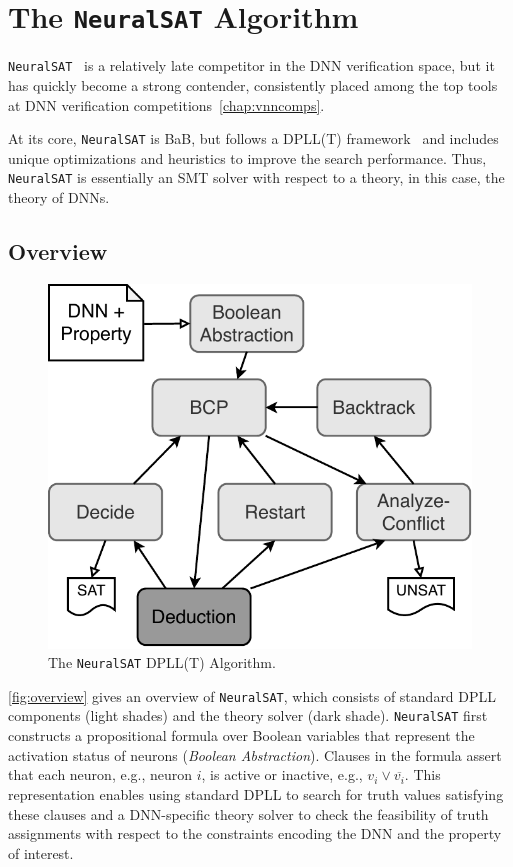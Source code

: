 \documentclass[oneside,11pt,dvipsnames]{book}
\numberwithin{equation}{section}
\theoremstyle{definition}
\theoremstyle{remark}
\newcommand{\neuralsat}{\texttt{NeuralSAT}}
\newcommand{\tool}{\texttt{NeuralSAT}}
\begin{document}





\chapter{The \neuralsat{} Algorithm}\label{chap:neuralsat}

\neuralsat{}~\cite{duong2025neuralsat,duong2024harnessing} is a relatively late competitor in the DNN verification space, but it has quickly become a strong contender, consistently placed among the top tools at DNN verification competitions~\autoref{chap:vnncomps}.

At its core, \neuralsat{} is BaB, but follows a DPLL(T) framework~\cite{davis1962machine} and includes unique optimizations and heuristics to improve the search performance.
Thus, \neuralsat{} is essentially an SMT solver with respect to a theory, in this case, the theory of DNNs.

\section{Overview}\label{sec:neuralsat:overview}
\begin{figure}[h]
    \centering
    \includegraphics[width=0.4\linewidth]{figure/arch.pdf}
    \caption{\label{fig:overview} The \neuralsat{} DPLL(T) Algorithm.} 
\end{figure}


\autoref{fig:overview} gives an overview of \neuralsat{}, which consists of standard DPLL components (light shades) and the theory solver (dark shade).
\neuralsat{} first constructs a propositional formula over Boolean variables that represent the activation status of neurons (\emph{Boolean Abstraction}). Clauses in the formula assert that each neuron, e.g., neuron $i$, is active or inactive, e.g., $v_i \vee \overline{v_i}$.
This representation enables using standard DPLL to search for truth values satisfying these clauses and a DNN-specific theory solver to check the feasibility of truth assignments with respect to the constraints encoding the DNN and the property of interest.
\end{document}
